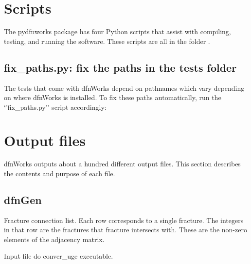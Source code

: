 \documentclass[letterpaper,10pt,english]{sphinxmanual}
\begin{document}
\chapter{Scripts}
\label{\detokenize{scripts:scripts}}\label{\detokenize{scripts:scripts-chapter}}\label{\detokenize{scripts::doc}}
The pydfnworks package has four Python scripts that assist with compiling, testing, and running the software. These scripts are all in the folder  .


\section{fix\_paths.py: fix the paths in the tests folder}
\label{\detokenize{scripts:fix-paths-py-fix-the-paths-in-the-tests-folder}}
The tests that come with dfnWorks depend on pathnames which vary depending on where dfnWorks is installed. To fix these paths automatically, run the ‘’fix\_paths.py’’ script accordingly:



\chapter{Output files}
\label{\detokenize{output:output-files}}\label{\detokenize{output:output-chapter}}\label{\detokenize{output::doc}}
dfnWorks outputs about a hundred different output files. This section describes the contents and purpose of each file.


\section{dfnGen}
\label{\detokenize{output:dfngen}}

\label{\detokenize{output:aperture-dat}}

\label{\detokenize{output:connectivity-dat}}
Fracture connection list. Each row corresponds to a single fracture. The integers in that row are the fractures that fracture intersects with. These are the non-zero elements of the adjacency matrix.


\label{\detokenize{output:convert-uge-params-txt}}
Input file do conver\_uge executable.

\end{document}
